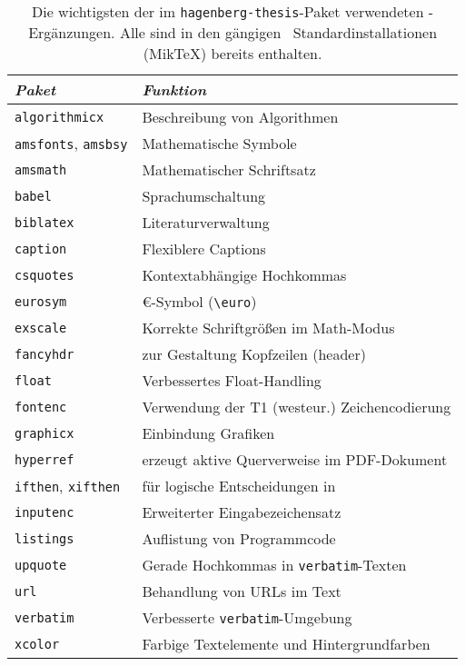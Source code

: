 \begin{table}
    \caption{Die wichtigsten der im \texttt{hagenberg-thesis}-Paket
    verwendeten \latex-Ergänzungen. Alle sind in den gängigen \latex\
    Standardinstallationen (\zB MikTeX) bereits enthalten.}
    \label{tab:packages}
    \centering\small
    \begin{tabular}{@{}ll@{}}
        \toprule
        \emph{Paket}          & \emph{Funktion} \\
        \midrule
        \texttt{algorithmicx} & Beschreibung von Algorithmen \\
        \texttt{amsfonts},
        \texttt{amsbsy}       & Mathematische Symbole \\
        \texttt{amsmath}      & Mathematischer Schriftsatz \\
        \texttt{babel}        & Sprachumschaltung \\
        \texttt{biblatex}     & Literaturverwaltung \\
        \texttt{caption}      & Flexiblere Captions \\
        \texttt{csquotes}     & Kontextabhängige Hochkommas \\
        \texttt{eurosym}      & {\euro}-Symbol (\verb!\euro!) \\
        \texttt{exscale}      & Korrekte Schriftgrößen im Math-Modus \\
        \texttt{fancyhdr}     & zur Gestaltung Kopfzeilen (header) \\
        \texttt{float}        & Verbessertes Float-Handling \\
        \texttt{fontenc}      & Verwendung der T1 (westeur.) Zeichencodierung \\
        \texttt{graphicx}     & Einbindung Grafiken \\
        \texttt{hyperref}     & erzeugt aktive Querverweise im PDF-Dokument \\
        \texttt{ifthen},
        \texttt{xifthen}      & für logische Entscheidungen in \latex \\
        \texttt{inputenc}     & Erweiterter Eingabezeichensatz \\
        \texttt{listings}     & Auflistung von Programmcode \\
        \texttt{upquote}      & Gerade Hochkommas in \texttt{verbatim}-Texten \\
        \texttt{url}          & Behandlung von URLs im Text \\
        \texttt{verbatim}     & Verbesserte \texttt{verbatim}-Umgebung \\
        \texttt{xcolor}       & Farbige Textelemente und Hintergrundfarben \\
        \bottomrule
    \end{tabular}
\end{table}


